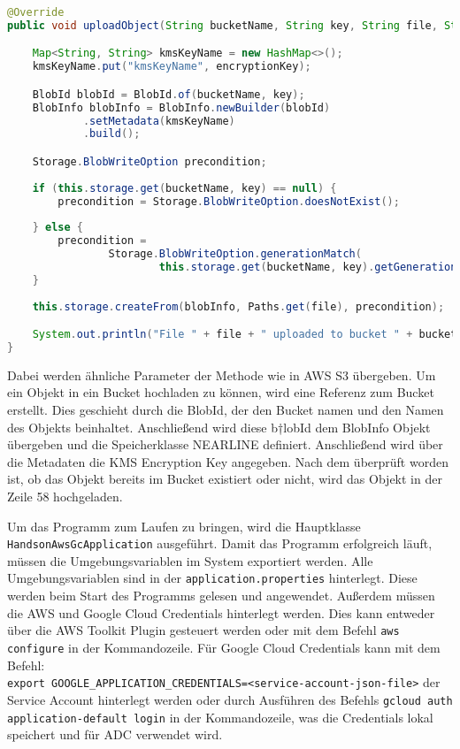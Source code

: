 \begin{lstlisting}[language=Java, caption=Prototyp Code Snippet - Hochladen eines Objekts nach Cloud Storage]
@Override
public void uploadObject(String bucketName, String key, String file, String encryptionKey, String storageClass) throws IOException {

    Map<String, String> kmsKeyName = new HashMap<>();
    kmsKeyName.put("kmsKeyName", encryptionKey);

    BlobId blobId = BlobId.of(bucketName, key);
    BlobInfo blobInfo = BlobInfo.newBuilder(blobId)
            .setMetadata(kmsKeyName)
            .build();

    Storage.BlobWriteOption precondition;
        
    if (this.storage.get(bucketName, key) == null) {
        precondition = Storage.BlobWriteOption.doesNotExist();
            
    } else {
        precondition =
                Storage.BlobWriteOption.generationMatch(
                        this.storage.get(bucketName, key).getGeneration());
    }
        
    this.storage.createFrom(blobInfo, Paths.get(file), precondition);

    System.out.println("File " + file + " uploaded to bucket " + bucketName + " as " + key);
}
\end{lstlisting}

Dabei werden ähnliche Parameter der Methode wie in AWS S3 übergeben. Um ein Objekt in ein Bucket hochladen zu können, wird eine Referenz zum Bucket erstellt. Dies geschieht durch die BlobId, der den Bucket namen und den Namen des Objekts beinhaltet. Anschließend wird diese b†lobId dem BlobInfo Objekt übergeben und die Speicherklasse NEARLINE definiert. Anschließend wird über die Metadaten die KMS Encryption Key angegeben. Nach dem überprüft worden ist, ob das Objekt bereits im Bucket existiert oder nicht, wird das Objekt in der Zeile 58 hochgeladen.

Um das Programm zum Laufen zu bringen, wird die Hauptklasse \verb|HandsonAwsGcApplication| ausgeführt. Damit das Programm erfolgreich läuft, müssen die Umgebungsvariablen im System exportiert werden. Alle Umgebungsvariablen sind in der \verb|application.properties| hinterlegt. Diese werden beim Start des Programms gelesen und angewendet. Außerdem müssen die AWS  und Google Cloud Credentials hinterlegt werden. Dies kann entweder über die AWS Toolkit Plugin gesteuert werden oder mit dem Befehl \verb|aws configure| in der Kommandozeile. Für Google Cloud Credentials kann mit dem Befehl: \\ \verb|export GOOGLE_APPLICATION_CREDENTIALS=<service-account-json-file>| der Service Account hinterlegt werden oder durch Ausführen des Befehls \verb|gcloud auth application-default login| in der Kommandozeile, was die Credentials lokal speichert und für ADC verwendet wird.

